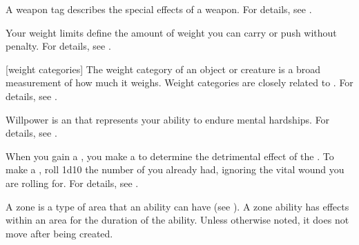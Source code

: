  A weapon tag describes the special effects of a weapon.
For details, see .

 Your weight limits define the amount of weight you can carry or push without penalty.
For details, see .

[weight categories] The weight category of an object or creature is a broad measurement of how much it weighs.
Weight categories are closely related to .
For details, see .

 Willpower is an  that represents your ability to endure mental hardships.
For details, see .

 When you gain a , you make a  to determine the detrimental effect of the .
To make a , roll 1d10 \sub the number of  you already had, ignoring the vital wound you are rolling for.
For details, see .

 A zone is a type of area that an ability can have (see ).
A zone ability has effects within an area for the duration of the ability.
Unless otherwise noted, it does not move after being created.
